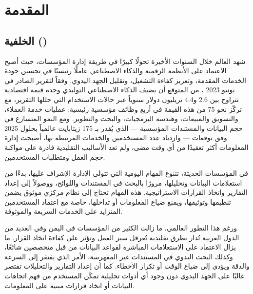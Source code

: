 \chapter{المقدمة}
\label{ch:introduction}

\section{الخلفية ()}
\label{sec:background}

شهد العالم خلال السنوات الأخيرة تحولًا كبيرًا في طريقة إدارة المؤسسات، حيث
أصبح الاعتماد على الأنظمة الرقمية والذكاء الاصطناعي عاملًا رئيسيًا في تحسين
جودة الخدمات المقدمة، وتعزيز كفاءة التشغيل، وتقليل الجهد اليدوي. وفقاً
لتقرير  الصادر في يونيو 2023 \cite{manyika2023genai}، من المتوقع أن يضيف الذكاء
الاصطناعي التوليدي وحده قيمة اقتصادية تتراوح بين 2.6 و4.4 تريليون دولار
سنوياً عبر حالات الاستخدام التي حللها التقرير، مع تركّز نحو 75\LR{\%} من هذه
القيمة في أربع وظائف مؤسسية رئيسية: عمليات خدمة العملاء، والتسويق والمبيعات،
وهندسة البرمجيات، والبحث والتطوير. ومع النمو المتسارع
في حجم البيانات والمستندات المؤسسية — الذي يُقدر بـ 175 زيتابايت عالمياً
بحلول 2025 وفق توقعات  \cite{reinsel2018idc} — وازدياد عدد المستخدمين والخدمات المرتبطة
بها، أصبحت إدارة المعلومات أكثر تعقيدًا من أي وقت مضى، ولم تعد الأساليب
التقليدية قادرة على مواكبة حجم العمل ومتطلبات المستخدمين.

في المؤسسات الحديثة، تتنوع المهام اليومية التي تتولى الإدارة الإشراف عليها،
بدءًا من استعلامات البيانات وتحليلها، مرورًا بالبحث في المستندات واللوائح،
ووصولاً إلى إعداد التقارير واتخاذ القرارات الاستراتيجية. هذه المهام تحتاج
إلى نظام مركزي موثوق يضمن تنظيمها وتوثيقها، ويمنع ضياع المعلومات أو
تداخلها، خاصة مع اعتماد المستخدمين المتزايد على الخدمات السريعة والموثوقة.

ورغم هذا التطور العالمي، ما زالت الكثير من المؤسسات في اليمن وفي العديد من
الدول العربية تُدار بطرق تقليدية تُعرقل سير العمل وتؤثر على كفاءة اتخاذ
القرار. ما يزال الاعتماد على الاستعلامات المباشرة لقواعد البيانات من قبل
متخصصين شائعًا، وكذلك البحث اليدوي في المستندات غير المفهرسة، الأمر الذي
يفتقر إلى السرعة والدقة ويؤدي إلى ضياع الوقت أو تكرار الأخطاء. كما أن إعداد
التقارير والتحليلات تقتصر غالبًا على الجهد اليدوي دون وجود أي أدوات تحليلية
تمكّن المستخدم من فهم اتجاهات البيانات أو اتخاذ قرارات مبنية على المعلومات.

